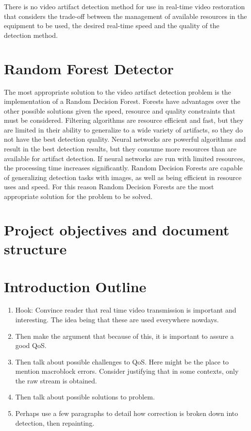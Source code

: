 There is no video artifact detection method for use in real-time video restoration that considers the trade-off between the management of available resources in the equipment to be used, the desired real-time speed and the quality of the detection method.

\section{Random Forest Detector}
\label{sec:intro_detector}

The most appropriate solution to the video artifact detection problem is the implementation of a Random Decision Forest. Forests have advantages over the other possible solutions given the speed, resource and quality constraints that must be considered. Filtering algorithms are resource efficient and fast, but they are limited in their ability to generalize to a wide variety of artifacts, so they do not have the best detection quality. Neural networks are powerful algorithms and result in the best detection results, but they consume more resources than are available for artifact detection. If neural networks are run with limited resources, the processing time increases significantly. Random Decision Forests are capable of generalizing detection tasks with \cite{Keskin2012} images, as well as being efficient in resource uses and speed. For this reason Random Decision Forests are the most appropriate solution for the problem to be solved.

\section{Project objectives and document structure}
\label{sec:intro_objectives}

\section{Introduction Outline}
\label{sec:intro_outline}

\begin{enumerate}
  \item Hook: Convince reader that real time video transmission is important and interesting. The idea being that these are used everywhere nowdays.
  \item Then make the argument that because of this, it is important to assure a good QoS.
  \item Then talk about possible challenges to QoS. Here might be the place to mention macroblock errors. Consider justifying that in some contexts, only the raw stream is obtained.
  \item Then talk about possible solutions to problem.
  \item Perhaps use a few paragraphs to detail how correction is broken down into detection, then repainting.
\end{enumerate}

